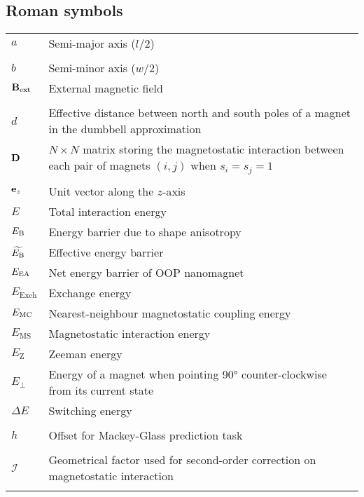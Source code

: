 \subsection*{Roman symbols}
\begin{longtable}[l]{p{60pt} p{350pt}}
	$a$ & Semi-major axis ($l/2$) \\
	&\\

	$b$ & Semi-minor axis ($w/2$) \\
	$\boldsymbol{\mathbf{B}}_\mathrm{ext}$ & External magnetic field \\
	&\\

	$d$ & Effective distance between north and south poles of a magnet in the dumbbell approximation \\
	$\boldsymbol{\mathbf{D}}$ & $N \times N$ matrix storing the magnetostatic interaction between each pair of magnets $(i,j)$ when $s_i=s_j=1$ \\
	&\\

	$\boldsymbol{\mathbf{e}}_z$ & Unit vector along the $z$-axis \\
	$E$ & Total interaction energy \\
	$E_\mathrm{B}$ & Energy barrier due to shape anisotropy \\ %
	$\widetilde{E_\mathrm{B}}$ & Effective energy barrier \\
	$E_\mathrm{EA}$ & Net energy barrier of OOP nanomagnet \\
	$E_\mathrm{Exch}$ & Exchange energy\\
	$E_\mathrm{MC}$ & Nearest-neighbour magnetostatic coupling energy \\
	$E_\mathrm{MS}$ & Magnetostatic interaction energy \\
	$E_\mathrm{Z}$ & Zeeman energy\\
	$E_\perp$ & Energy of a magnet when pointing \ang{90} counter-clockwise from its current state \\
	$\Delta E$ & Switching energy \\
	&\\

	$h$ & Offset for Mackey-Glass prediction task \\
	&\\

	$\mathcal{I}$ & Geometrical factor used for second-order correction on magnetostatic interaction \\
	&\\


\end{longtable}
